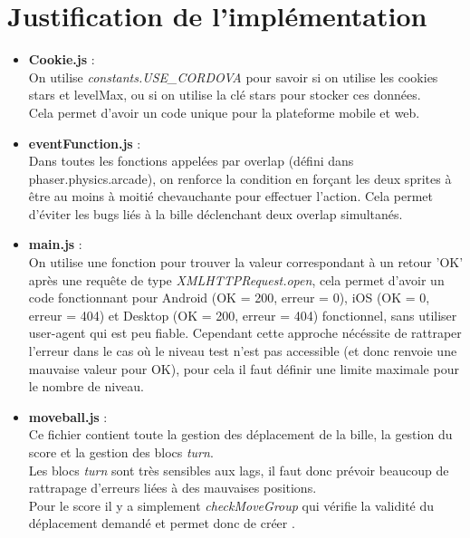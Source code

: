 \documentclass[11pt]{article}
\begin{document}
\section {Justification de l'implémentation}
\begin{itemize}
	\item
		\textbf{Cookie.js} :\\
		On utilise {\em constants.USE\_CORDOVA} pour savoir si on 
		utilise les cookies stars et levelMax, ou si on utilise
		la clé stars pour stocker ces données.\\
		Cela permet d'avoir un code unique pour la plateforme mobile et
		web.\\
	\item
		\textbf{eventFunction.js} :\\
		Dans toutes les fonctions appelées par overlap (défini dans 
		phaser.physics.arcade), on renforce la condition en forçant les
		deux sprites à être au moins à moitié chevauchante pour
		effectuer l'action. Cela permet d'éviter les bugs liés à la
		bille déclenchant deux overlap simultanés.\\
	\item
		\textbf{main.js} : \\
		On utilise une fonction pour trouver la valeur correspondant à
		un retour 'OK' après une requête de type 
		{\em XMLHTTPRequest.open}, cela permet d'avoir un code
		fonctionnant pour Android (OK = 200, erreur = 0), iOS (OK = 0,
		erreur = 404) et Desktop (OK = 200, erreur = 404) fonctionnel, 
		sans utiliser user-agent qui est peu fiable. Cependant cette
		approche nécéssite de rattraper l'erreur dans le cas où le 
		niveau test n'est pas accessible (et donc renvoie une mauvaise 
		valeur pour OK), pour cela il faut définir une limite maximale
		pour le nombre de niveau.\\
	\item
		\textbf{moveball.js} : \\
		Ce fichier contient toute la gestion des déplacement de la
		bille, la gestion du score et la gestion des blocs {\em turn}.\\
		Les blocs {\em turn} sont très sensibles aux lags, il faut
		donc prévoir beaucoup de rattrapage d'erreurs liées à des 
		mauvaises positions.\\
		Pour le score il y a simplement {\em checkMoveGroup} qui
		vérifie la validité du déplacement demandé et permet donc de 
		créer .\\
\end{itemize}
\end{document}
